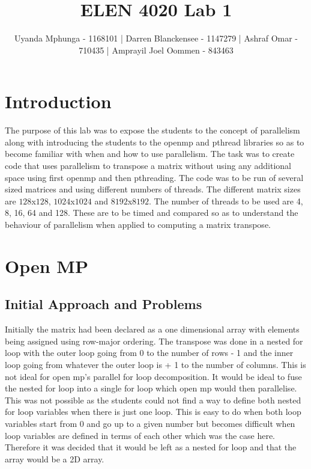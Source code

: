\documentclass[journal, a4paper]{IEEEtran}
\begin{document}
	\title{ELEN 4020 Lab 1}

	\author{\small Uyanda Mphunga - 1168101 | Darren Blanckensee - 1147279 | 
Ashraf Omar - 710435 | Amprayil Joel Oommen - 843463}

	\maketitle

\section{Introduction}
The purpose of this lab was to expose the students to the concept of parallelism along with introducing the students to the openmp and pthread libraries so as to become familiar with when and how to use parallelism. The task was to create code that uses parallelism to transpose a matrix without using any additional space using first openmp and then pthreading. The code was to be run of several sized matrices and using different numbers of threads. The different matrix sizes are $128$x$128$, $1024$x$1024$ and $8192$x$8192$. The number of threads to be used are 4, 8, 16, 64 and 128. These are to be timed and compared so as to understand the behaviour of parallelism when applied to computing a matrix transpose. 


\section{Open MP}
\subsection{Initial Approach and Problems}
\noindent
Initially the matrix had been declared as a one dimensional array with elements being assigned using row-major ordering. The transpose was done in a nested for loop with the outer loop going from 0 to the number of rows - 1 and the inner loop going from whatever the outer loop is + 1 to the number of columns. This is not ideal for open mp's parallel for loop decomposition. It would be ideal to fuse the nested for loop into a single for loop which open mp would then parallelise. This was not possible as the students could not find a way to define both nested for loop variables when there is just one loop. This is easy to do when both loop variables start from 0 and go up to a given number but becomes difficult when loop variables are defined in terms of each other which was the case here. Therefore it was decided that it would be left as a nested for loop and that the array would be a 2D array. \\
\end{document}
